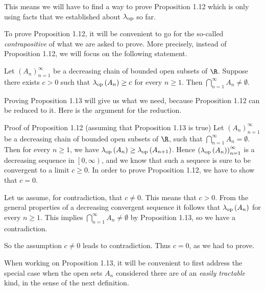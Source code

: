\documentclass[pmath450]{subfiles}
\begin{document}
    This means we will have to find a way to prove Proposition 1.12 which is only using facts that we established about $\lambda_{\operatorname{op}}$ so far.

    \np To prove Proposition 1.12, it will be convenient to go for the so-called \textit{contrapositive} of what we are asked to prove. More precisely, instead of Proposition 1.12, we will focus on the following statement.

    \begin{prop}{}
        Let $\left( A_{n} \right)^{\infty}_{n=1}$ be a decreasing chain of bounded open subsets of $\R$. Suppose there exists $c>0$ such that $\lambda_{\operatorname{op}}\left( A_n \right)\geq c$ for every $n\geq 1$. Then $\bigcap^{\infty}_{n=1}A_n\neq\emptyset$.
    \end{prop}

    \rruleline

    \np Proving Proposition 1.13 will give us what we need, because Proposition 1.12 can be reduced to it. Here is the argument for the reduction.

    \begin{boxyproof}{Proof of Proposition 1.12 (assuming that Proposition 1.13 is true)}
        Let $\left( A_{n} \right)^{\infty}_{n=1}$ be a decreasing chain of bounded open subsets of $\R$, such that $\bigcap^{\infty}_{n=1}A_n=\emptyset$. Then for every $n\geq 1$, we have $\lambda_{\operatorname{op}}\left( A_n \right)\geq\lambda_{\operatorname{op}}\left( A_{n+1} \right)$. Hence $\left( \lambda_{\operatorname{op}}\left( A_n \right) \right)^{\infty}_{n=1}$ is a decreasing sequence in $\left[ 0,\infty \right)$, and we know that such a sequece is sure to be convergent to a limit $c\geq 0$. In order to prove Proposition 1.12, we have to show that $c=0$.

        Let us assume, for contradiction, that $c\neq 0$. This means that $c>0$. From the general properties of a decreasing convergent sequence it follows that $\lambda_{\operatorname{op}}\left( A_n \right)$ for every $n\geq 1$. This implies $\bigcap^{\infty}_{n=1}A_n\neq\emptyset$ by Proposition 1.13, so we have a contradiction.

        So the assumption $c\neq 0$ leads to contradiction. Thus $c=0$, as we had to prove.
    \end{boxyproof}

    \np When working on Proposition 1.13, it will be convenient to first address the special case when the open sets $A_n$ considered there are of an \textit{easily tractable} kind, in the sense of the next definition.
\end{document}
